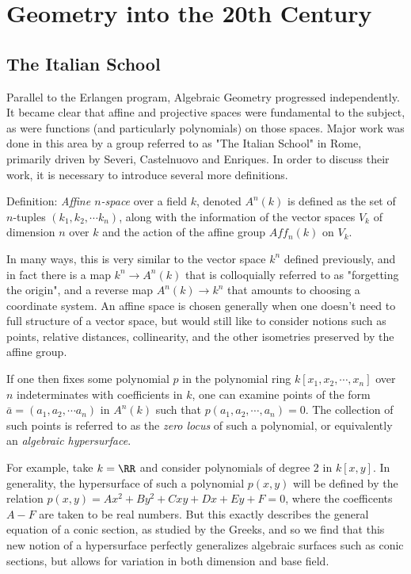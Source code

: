 \documentclass[]{article}
\begin{document}
\section{Geometry into the 20th Century}\label{header-n103}

\subsection{The Italian School}\label{header-n104}

Parallel to the Erlangen program, Algebraic Geometry progressed
independently. It became clear that affine and projective spaces were
fundamental to the subject, as were functions (and particularly
polynomials) on those spaces. Major work was done in this area by a
group referred to as "The Italian School" in Rome, primarily driven by
Severi, Castelnuovo and Enriques. In order to discuss their work, it is
necessary to introduce several more definitions.

Definition: \emph{Affine \(n\)-space} over a field \(k\), denoted
\(A^n(k)\) is defined as the set of \(n\)-tuples
\((k_1, k_2, \cdots k_n)\), along with the information of the vector
spaces \(V_k\) of dimension \(n\) over \(k\) and the action of the
affine group \(Aff_n(k)\) on \(V_k\).

In many ways, this is very similar to the vector space \(k^n\) defined
previously, and in fact there is a map \(k^n \rightarrow A^n(k)\) that
is colloquially referred to as "forgetting the origin", and a reverse
map \(A^n(k) \rightarrow k^n\) that amounts to choosing a coordinate
system. An affine space is chosen generally when one doesn't need to
full structure of a vector space, but would still like to consider
notions such as points, relative distances, collinearity, and the other
isometries preserved by the affine group.

If one then fixes some polynomial \(p\) in the polynomial ring
\(k[x_1, x_2, \cdots, x_n]\) over \(n\) indeterminates with coefficients
in \(k\), one can examine points of the form
\(\bar{a} = (a_1, a_2, \cdots a_n)\) in \(A^n(k)\) such that
\(p(a_1, a_2, \cdots, a_n) = 0\). The collection of such points is
referred to as the \emph{zero locus} of such a polynomial, or
equivalently an \emph{algebraic hypersurface}.

For example, take \(k=\RR\) and consider polynomials of degree 2 in
\(k[x,y]\). In generality, the hypersurface of such a polynomial
\(p(x,y)\) will be defined by the relation
\(p(x,y) = Ax^2 + By^2 + Cxy + Dx + Ey + F = 0\), where the coefficents
\(A-F\) are taken to be real numbers. But this exactly describes the
general equation of a conic section, as studied by the Greeks, and so we
find that this new notion of a hypersurface perfectly generalizes
algebraic surfaces such as conic sections, but allows for variation in
both dimension and base field.
\end{document}
